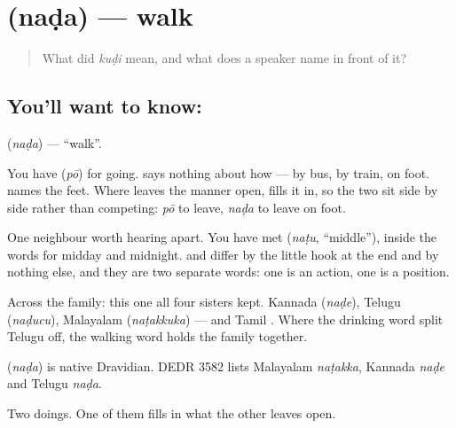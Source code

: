 \section[\texorpdfstring{\ta{நட} (naḍa)}{நட (naḍa)}]{ (naḍa) — walk}

\label{lesson:TA-C65-walk}



\begin{quote}
What did \emph{kuḍi} mean, and what does a speaker name in front of it?
\end{quote}

\subsection*{You'll want to know: }
\textbf{} (\emph{naḍa}) — \textquotedblleft{}walk\textquotedblright{}.

You have  (\emph{pō}) for going.  says nothing about how — by bus, by train, on foot.  names the feet. Where  leaves the manner open,  fills it in, so the two sit side by side rather than competing: \emph{pō} to leave, \emph{naḍa} to leave on foot.

One neighbour worth hearing apart. You have met \textbf{} (\emph{naṭu}, \textquotedblleft{}middle\textquotedblright{}), inside the words for midday and midnight. \textbf{} and \textbf{} differ by the little \textbf{} hook at the end and by nothing else, and they are two separate words: one is an action, one is a position.

Across the family: this one all four sisters kept. Kannada  (\emph{naḍe}), Telugu  (\emph{naḍucu}), Malayalam  (\emph{naṭakkuka}) — and Tamil . Where the drinking word split Telugu off, the walking word holds the family together.

\begin{cousinweb}
\textbf{} (\emph{naḍa}) is native Dravidian. DEDR 3582 lists Malayalam \emph{naṭakka}, Kannada \emph{naḍe} and Telugu \emph{naḍa}.
\end{cousinweb}

\begin{grammarlens}[title={What you've built}]
Two doings. One of them fills in what the other leaves open.
\end{grammarlens}


